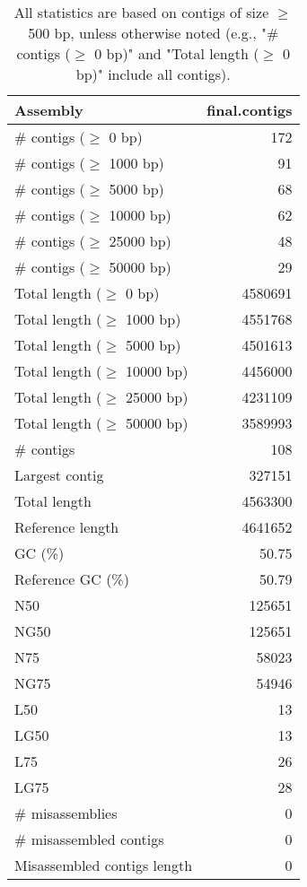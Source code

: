 \documentclass[12pt,a4paper]{article}
\begin{document}
\begin{table}[ht]
\begin{center}
\caption{All statistics are based on contigs of size $\geq$ 500 bp, unless otherwise noted (e.g., "\# contigs ($\geq$ 0 bp)" and "Total length ($\geq$ 0 bp)" include all contigs).}
\begin{tabular}{|l*{1}{|r}|}
\hline
Assembly & final.contigs \\ \hline
\# contigs ($\geq$ 0 bp) & 172 \\ \hline
\# contigs ($\geq$ 1000 bp) & 91 \\ \hline
\# contigs ($\geq$ 5000 bp) & 68 \\ \hline
\# contigs ($\geq$ 10000 bp) & 62 \\ \hline
\# contigs ($\geq$ 25000 bp) & 48 \\ \hline
\# contigs ($\geq$ 50000 bp) & 29 \\ \hline
Total length ($\geq$ 0 bp) & 4580691 \\ \hline
Total length ($\geq$ 1000 bp) & 4551768 \\ \hline
Total length ($\geq$ 5000 bp) & 4501613 \\ \hline
Total length ($\geq$ 10000 bp) & 4456000 \\ \hline
Total length ($\geq$ 25000 bp) & 4231109 \\ \hline
Total length ($\geq$ 50000 bp) & 3589993 \\ \hline
\# contigs & 108 \\ \hline
Largest contig & 327151 \\ \hline
Total length & 4563300 \\ \hline
Reference length & 4641652 \\ \hline
GC (\%) & 50.75 \\ \hline
Reference GC (\%) & 50.79 \\ \hline
N50 & 125651 \\ \hline
NG50 & 125651 \\ \hline
N75 & 58023 \\ \hline
NG75 & 54946 \\ \hline
L50 & 13 \\ \hline
LG50 & 13 \\ \hline
L75 & 26 \\ \hline
LG75 & 28 \\ \hline
\# misassemblies & 0 \\ \hline
\# misassembled contigs & 0 \\ \hline
Misassembled contigs length & 0 \\ \hline

\end{tabular}
\end{center}
\end{table}
\end{document}
